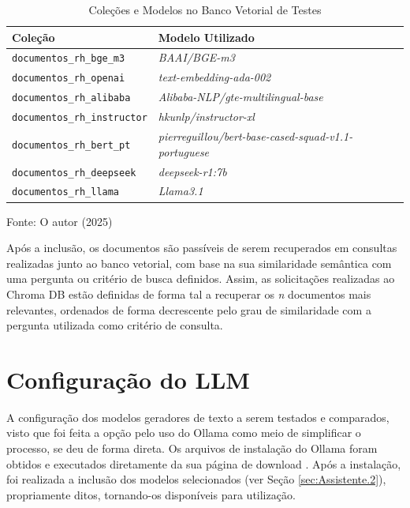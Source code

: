 \begin{table}[H]
    \caption{Coleções e Modelos no Banco Vetorial de Testes}
    \centering
    \begin{tabular}{ l l }
        \hline
        \textbf{Coleção} & \textbf{Modelo Utilizado} \\  
        \hline
        \texttt{documentos\_rh\_bge\_m3} & \textit{BAAI/BGE-m3} \\
        \texttt{documentos\_rh\_openai} & \textit{text-embedding-ada-002} \\
        \texttt{documentos\_rh\_alibaba} & \textit{Alibaba-NLP/gte-multilingual-base} \\
        \texttt{documentos\_rh\_instructor} & \textit{hkunlp/instructor-xl} \\
        \texttt{documentos\_rh\_bert\_pt} & \textit{pierreguillou/bert-base-cased-squad-v1.1-portuguese} \\
        \texttt{documentos\_rh\_deepseek} & \textit{deepseek-r1:7b} \\
        \texttt{documentos\_rh\_llama} & \textit{Llama3.1} \\
        \hline
    \end{tabular}   
    
    Fonte: O autor (2025)
    \label{tab:colecoes-modelos-embeddings}
\end{table}

Após a inclusão, os documentos são passíveis de serem recuperados em consultas realizadas junto ao banco vetorial, com base na sua similaridade semântica com uma pergunta ou critério de busca definidos. Assim, as solicitações realizadas ao Chroma DB estão definidas de forma tal a recuperar os \textit{n} documentos mais relevantes, ordenados de forma decrescente pelo grau de similaridade com a pergunta utilizada como critério de consulta.

\section{Configuração do LLM}
\label{sec:Metodologia.3}
A configuração dos modelos geradores de texto a serem testados e comparados, visto que foi feita a opção pelo uso do Ollama como meio de simplificar o processo, se deu de forma direta. Os arquivos de instalação do Ollama foram obtidos e executados diretamente da sua página de download \cite{Ollama:2}. Após a instalação, foi realizada a inclusão dos modelos selecionados (ver Seção \ref{sec:Assistente.2}), propriamente ditos, tornando-os disponíveis para utilização.

